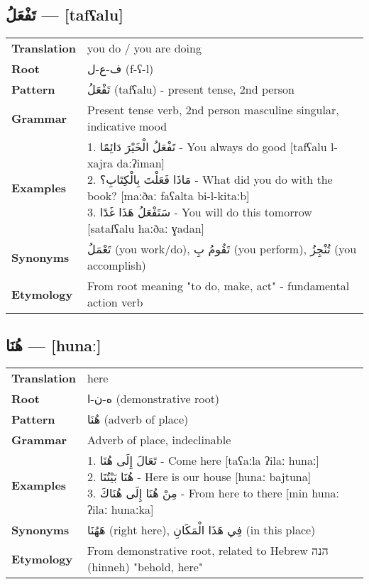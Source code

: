 \documentclass[letterpaper,12pt]{article}
\begin{document}
\subsection{\textarabic{تَفْعَلُ} — [tafʕalu]}

\begin{tabular}{p{3cm}p{10cm}}
\toprule
\textbf{Translation} & you do / you are doing \\
\textbf{Root} & \textarabic{ف-ع-ل} (f-ʕ-l) \\
\textbf{Pattern} & \textarabic{تَفْعَلُ} (tafʕalu) - present tense, 2nd person \\
\textbf{Grammar} & Present tense verb, 2nd person masculine singular, indicative mood \\
\textbf{Examples} & \makecell[l]{\parbox{9.5cm}{
1. \textarabic{تَفْعَلُ الْخَيْرَ دَائِمًا} - You always do good [tafʕalu l-xajra daːʔiman]\\
2. \textarabic{مَاذَا فَعَلْتَ بِالْكِتَابِ؟} - What did you do with the book? [maːðaː faʕalta bi-l-kitaːb]\\
3. \textarabic{سَتَفْعَلُ هَذَا غَدًا} - You will do this tomorrow [satafʕalu haːðaː ɣadan]
}} \\
\midrule
\textbf{Synonyms} & \textarabic{تَعْمَلُ} (you work/do), \textarabic{تَقُومُ بِ} (you perform), \textarabic{تُنْجِزُ} (you accomplish) \\
\textbf{Etymology} & From root meaning "to do, make, act" - fundamental action verb \\
\bottomrule
\end{tabular}

\subsection{\textarabic{هُنَا} — [hunaː]}

\begin{tabular}{p{3cm}p{10cm}}
\toprule
\textbf{Translation} & here \\
\textbf{Root} & \textarabic{ه-ن-ا} (demonstrative root) \\
\textbf{Pattern} & \textarabic{هُنَا} (adverb of place) \\
\textbf{Grammar} & Adverb of place, indeclinable \\
\textbf{Examples} & \makecell[l]{\parbox{9.5cm}{
1. \textarabic{تَعَالَ إِلَى هُنَا} - Come here [taʕaːla ʔilaː hunaː]\\
2. \textarabic{هُنَا بَيْتُنَا} - Here is our house [hunaː bajtuna]\\
3. \textarabic{مِنْ هُنَا إِلَى هُنَاكَ} - From here to there [min hunaː ʔilaː hunaːka]
}} \\
\midrule
\textbf{Synonyms} & \textarabic{هَهُنَا} (right here), \textarabic{فِي هَذَا الْمَكَانِ} (in this place) \\
\textbf{Etymology} & From demonstrative root, related to Hebrew \texthebrew{הנה} (hinneh) "behold, here" \\
\bottomrule
\end{tabular}
\end{document}

